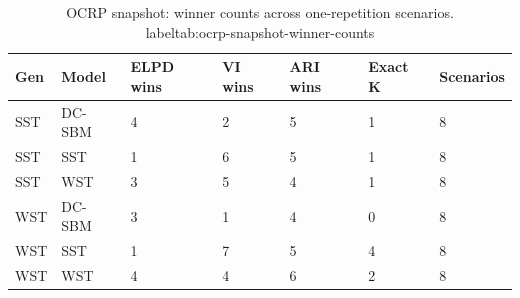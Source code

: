 \begin{table}[!h]
\centering
\caption{OCRP snapshot: winner counts across one-repetition scenarios.\\label{tab:ocrp-snapshot-winner-counts}}
\centering
\begin{tabular}[t]{lllllll}
\toprule
Gen & Model & ELPD wins & VI wins & ARI wins & Exact K & Scenarios\\
\midrule
SST & DC-SBM & 4 & 2 & 5 & 1 & 8\\
SST & SST & 1 & 6 & 5 & 1 & 8\\
SST & WST & 3 & 5 & 4 & 1 & 8\\
WST & DC-SBM & 3 & 1 & 4 & 0 & 8\\
WST & SST & 1 & 7 & 5 & 4 & 8\\
WST & WST & 4 & 4 & 6 & 2 & 8\\
\bottomrule
\end{tabular}
\end{table}

